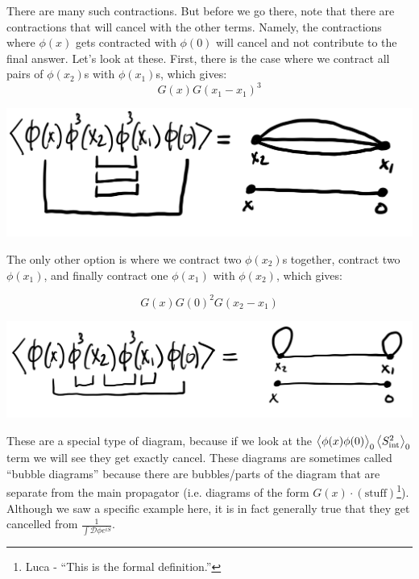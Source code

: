 There are many such contractions. But before we go there, note that there are contractions that will cancel with the other terms. Namely, the contractions where $\phi(x)$ gets contracted with $\phi(0)$ will cancel and not contribute to the final answer. Let's look at these. First, there is the case where we contract all pairs of $\phi(x_2)$s with $\phi(x_1)$s, which gives:
\begin{equation}
    G(x)G(x_1 - x_1)^3
\end{equation}
\begin{center}
    \includegraphics[scale=0.4]{Lectures/Figures/lec11-diag1.png}
\end{center}

The only other option is where we contract two $\phi(x_2)$s together, contract two $\phi(x_1)$, and finally contract one $\phi(x_1)$ with $\phi(x_2)$, which gives:

\begin{equation}
    G(x)G(0)^2G(x_2 - x_1)
\end{equation}

\begin{center}
    \includegraphics[scale=0.4]{Lectures/Figures/lec11-diag2.png}
\end{center}

These are a special type of diagram, because if we look at the $\left< \phi(x)\phi(0) \right>_0\left< S_{\text{int}}^2 \right>_0$ term we will see they get exactly cancel. These diagrams are sometimes called ``bubble diagrams'' because there are bubbles/parts of the diagram that are separate from the main propagator (i.e. diagrams of the form $G(x) \cdot (\text{stuff})$\footnote{Luca - ``This is the formal definition.''}). Although we saw a specific example here, it is in fact generally true that they get cancelled from $\frac{1}{\int \mathcal{D} \phi e^{iS}}$.

